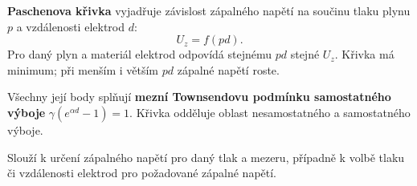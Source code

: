 \textbf{Paschenova křivka} vyjadřuje závislost zápalného napětí na součinu tlaku plynu $p$ a vzdálenosti elektrod $d$:
\[U_z=f(pd).\]
Pro daný plyn a materiál elektrod odpovídá stejnému $pd$ stejné $U_z$. Křivka má minimum; při menším i větším $pd$ zápalné napětí roste.

Všechny její body splňují \textbf{mezní Townsendovu podmínku samostatného výboje} $\gamma(e^{\alpha d}-1)=1$. Křivka odděluje oblast nesamostatného a samostatného výboje.

Slouží k určení zápalného napětí pro daný tlak a mezeru, případně k volbě tlaku či vzdálenosti elektrod pro požadované zápalné napětí.
